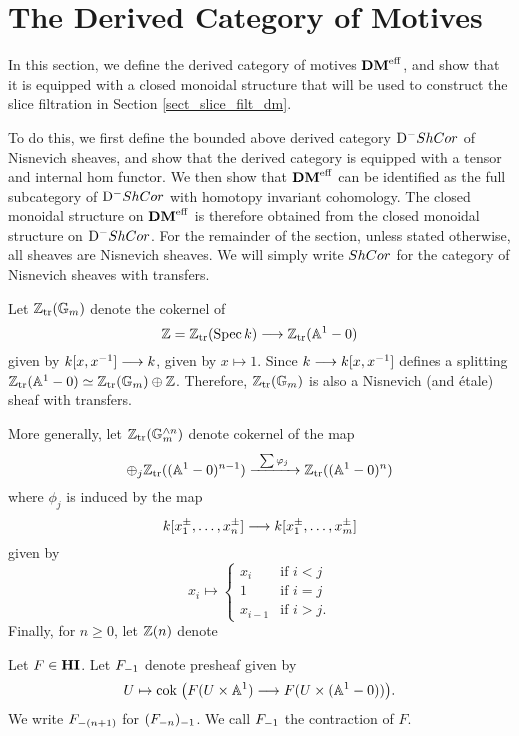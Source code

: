 \newpage
\section{The Derived Category of Motives}\label{sect_dmeff_and_dm}

In this section, we define the derived category of motives $\DMeff$,
and show that it is equipped with a closed monoidal structure that
will be used to construct the slice filtration in Section 
\ref{sect_slice_filt_dm}.

To do this, we first define the bounded above derived category 
$\DShCor$ of Nisnevich sheaves, and show that the derived 
category is equipped with a tensor and internal hom functor. We 
then show that $\DMeff$ can be identified as the full subcategory 
of $\DShCor$ with homotopy invariant cohomology. The closed
monoidal structure on $\DMeff$ is therefore obtained from the
closed monoidal structure on $\DShCor$. For the remainder of the
section, unless stated otherwise, all sheaves are Nisnevich 
sheaves. We will simply write $\ShCor$ for the category of 
Nisnevich sheaves with transfers.

\begin{defn}\label{def_z_n}
Let $\Ztr(\Gm)$ denote the cokernel of
\[
\Z = \Ztr(\Spec \basefield) \to \Ztr(\A^1 - 0)
\]
given by $\basefield [x, x^{-1}] \to \basefield$, given by
$x \mapsto 1$. Since $\basefield \to \basefield[x, x^{-1}]$
defines a splitting $\Ztr(\A^1 - 0) \simeq \Ztr(\Gm) \oplus \Z$.
Therefore, $\Ztr(\Gm)$ is also a Nisnevich (and \'etale) sheaf 
with transfers.

More generally, let $\Ztr(\Gmn{n})$ denote cokernel of the map 
\[
\oplus_j \Ztr((\A^1 - 0)^{n - 1}) \xrightarrow{\;\;\sum \phi_j\;\;}
\Ztr((\A^1 - 0)^n)
\]
where $\phi_j$ is induced by the map
\[
\basefield[x_1^{\pm},\dots,x_n^{\pm}] \to \basefield[x_1^{\pm},
\dots, x_m^{\pm}]
\]
given by
\[
x_i \mapsto
\begin{cases}
x_i &\textrm{if } i < j \\
1   &\textrm{if } i = j \\
x_{i - 1} &\textrm{if } i > j.
\end{cases}
\]
Finally, for $n \geq 0$, let $\Z(n)$ denote
\end{defn}


\begin{defn}
Let $F \in \HI$. Let $\RHI{F}$ denote presheaf given by
\[
U \mapsto \cok\big( F(U \times \A^1) \to 
   F(U \times (\A^1 - 0))\big).
\]
We write $\RHI[(n + 1)]{F}$ for $\RHI{(\RHI[n]{F})}$. We call 
$\RHI{F}$ the contraction of $F$.
\end{defn}

